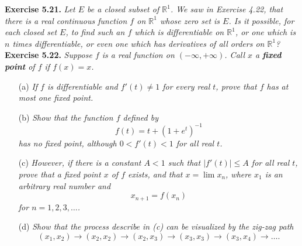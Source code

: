 \documentclass{article}
\begin{document}



\textbf{Exercise 5.21.}
\emph{Let $E$ be a closed subset of $\mathbb{R}^1$.
We saw in Exercise 4.22, that there is a real continuous function $f$ on $\mathbb{R}^1$
whose zero set is $E$.
Is it possible, for each closed set $E$,
to find such an $f$ which is differentiable on $\mathbb{R}^1$,
or one which is $n$ times differentiable,
or even one which has derivatives of all orders on $\mathbb{R}^1$?} \\






\textbf{Exercise 5.22.}
\emph{Suppose $f$ is a real function on $(-\infty,+\infty)$.
Call $x$ a \textbf{fixed point} of $f$ if $f(x)=x$.}
\begin{enumerate}
  \item[(a)]
  \emph{If $f$ is differentiable and $f'(t) \neq 1$ for every real $t$,
  prove that $f$ has at most one fixed point.}

  \item[(b)]
  \emph{Show that the function $f$ defined by
  \[
    f(t) = t+(1+e^t)^{-1}
  \]
  has no fixed point, although $0 < f'(t) < 1$ for all real $t$.}

  \item[(c)]
  \emph{However, if there is a constant $A<1$ such that $|f'(t)| \leq A$ for all real $t$,
  prove that a fixed point $x$ of $f$ exists,
  and that $x = \lim x_n$, where $x_1$ is an arbitrary real number and
  \[
    x_{n+1} = f(x_n)
  \]
  for $n = 1,2,3,\ldots$.}

  \item[(d)]
  \emph{Show that the process describe in (c) can be visualized by the zig-zag path
  \[
    (x_1,x_2) \to (x_2,x_2) \to (x_2,x_3) \to (x_3,x_3) \to (x_3,x_4) \to \ldots.
  \]}
  \end{enumerate}


\end{document}
